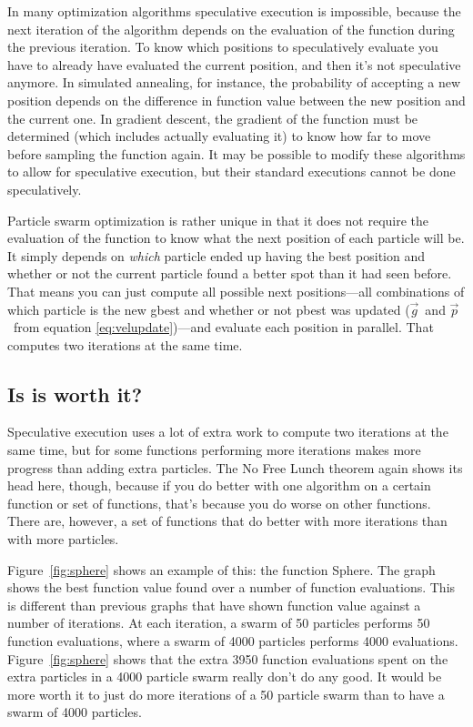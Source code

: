 \documentclass[onecolumn, 12pt]{article}
\providecommand{\gbest}{\ensuremath{\Vec{g}}}
\providecommand{\pbest}{\ensuremath{\Vec{p}}}
\begin{document}
In many optimization algorithms speculative execution is impossible, because
the next iteration of the algorithm depends on the evaluation of the function
during the previous iteration.  To know which positions to speculatively
evaluate you have to already have evaluated the current position, and then it's
not speculative anymore.  In simulated annealing, for instance, the probability
of accepting a new position depends on the difference in function value between
the new position and the current one.  In gradient descent, the gradient of the
function must be determined (which includes actually evaluating it) to know how
far to move before sampling the function again.  It may be possible to modify
these algorithms to allow for speculative execution, but their standard
executions cannot be done speculatively.

Particle swarm optimization is rather unique in that it does not require the
evaluation of the function to know what the next position of each particle will
be.  It simply depends on \emph{which} particle ended up having the best
position and whether or not the current particle found a better spot than it
had seen before.  That means you can just compute all possible next
positions---all combinations of which particle is the new gbest and whether or
not pbest was updated (\gbest\ and \pbest\ from equation
\eqref{eq:velupdate})---and evaluate each position in parallel.  That computes
two iterations at the same time.  

\subsection{Is is worth it?}

Speculative execution uses a lot of extra work to compute two iterations at the
same time, but for some functions performing more iterations makes more
progress than adding extra particles.  The No Free Lunch theorem again shows
its head here, though, because if you do better with one algorithm on a certain
function or set of functions, that's because you do worse on other functions.
There are, however, a set of functions that do better with more iterations than
with more particles.

Figure~\ref{fig:sphere} shows an example of this: the function Sphere.  The
graph shows the best function value found over a number of function
evaluations.  This is different than previous graphs that have shown function
value against a number of iterations.  At each iteration, a swarm of 50
particles performs 50 function evaluations, where a swarm of 4000 particles
performs 4000 evaluations.  Figure~\ref{fig:sphere} shows that the extra 3950
function evaluations spent on the extra particles in a 4000 particle swarm
really don't do any good.  It would be more worth it to just do more iterations
of a 50 particle swarm than to have a swarm of 4000 particles.
\end{document}
